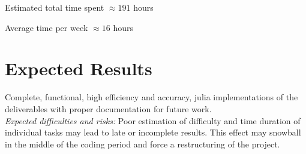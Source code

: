 \documentclass{article}
\theoremstyle{mytheoremstyle}
\theoremstyle{mytheoremstyle}
\theoremstyle{myproblemstyle}
\begin{document}
      \vspace{5px}

      Estimated total time spent $\approx 191 $ hours 
      
      Average time per week $\approx 16 $ hours 
  
  \section*{Expected Results}\label{sec:Results} %
    Complete, functional, high efficiency and accuracy, julia implementations of the deliverables with proper documentation for future work.
    \vspace{5px}
    \\ \textit{Expected difficulties and risks:} Poor estimation of difficulty and time duration of individual tasks may lead to late or incomplete results.
    This effect may snowball in the middle of the coding period and force a restructuring of the project.
    
  
    
\end{document}
